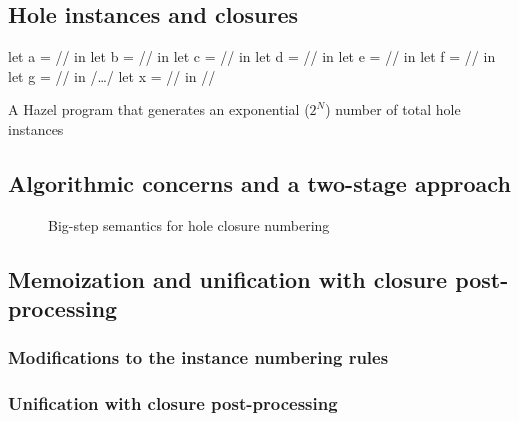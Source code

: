 \subsection{Hole instances and closures}
\label{sec:hole_instances_and_closures}

\begin{listing}
  \centering
  \begin{hminted}
let a = // in
let b = // in
let c = // in
let d = // in
let e = // in
let f = // in
let g = // in
/\dots/
let x = // in
//
  \end{hminted}
  \caption{A Hazel program that generates an exponential ($2^N$) number of total hole instances}
  \label{fig:hole_renumbering_problem}
\end{listing}

\subsection{Algorithmic concerns and a two-stage approach}
\label{sec:two-stage-renumber}

\begin{figure}
  \centering
  \begin{mdframed}
    \begin{singlespace}
      
    \end{singlespace}
  \end{mdframed}
  \caption{Big-step semantics for hole closure numbering}
  \label{fig:big-step-renumber-new-rules}
\end{figure}


\subsection{Memoization and unification with closure post-processing}
\label{sec:renumbering_memoization}

\subsubsection{Modifications to the instance numbering rules}
\label{sec:memoization-instance-numbering}

\subsubsection{Unification with closure post-processing}
\label{sec:unification-postprocessing}

